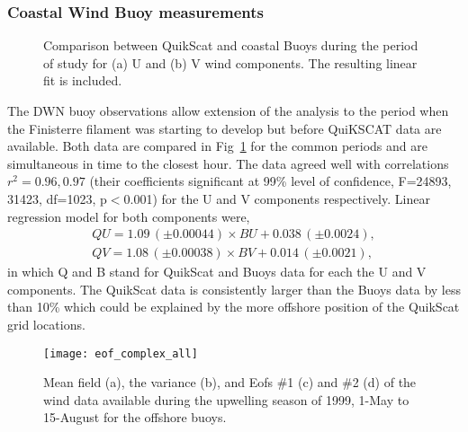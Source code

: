\subsubsection{Coastal Wind Buoy measurements}
\begin{figure}
\caption{Comparison between QuikScat and coastal Buoys during the
period of study for (a) U and (b) V wind components. The resulting
linear fit is included.}\label{fig:windsbuoycal}
\end{figure}

The DWN buoy observations allow extension of the analysis to the
period when the Finisterre filament was starting to develop but
before QuiKSCAT data are available. Both data are compared in
Fig~\ref{fig:windsbuoycal} for the common periods and are
simultaneous in time to the closest hour. The data agreed well
with correlations $r^2=0.96,0.97$ (their coefficients significant
at 99\% level of confidence, F=24893, 31423, df=1023, p$<$0.001)
for the U and V components respectively. Linear regression model
for both components were,
\begin{eqnarray}
  QU = 1.09\,(\pm 0.00044)\times BU + 0.038\,(\pm 0.0024),\label{eq:BcorrU} \\
  QV = 1.08\,(\pm 0.00038)\times BV + 0.014 \,(\pm 0.0021),\label{eq:BcorrV}
\end{eqnarray}
in which Q and B stand for QuikScat and Buoys data for each the U
and V components. The QuikScat data is consistently larger than
the Buoys data by less than 10\% which could be explained by the
more offshore position of the QuikScat grid locations.
\begin{figure}
\texttt{[image: eof\_complex\_all]}
\caption{Mean field (a), the variance (b), and Eofs \#1 (c) and
\#2 (d) of the wind data available during the upwelling season of
1999, 1-May to 15-August for the offshore
buoys.}\label{fig:windsmeanvarbuoys}
\end{figure}

